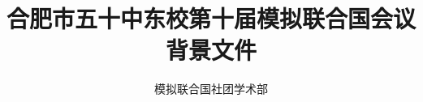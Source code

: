\documentclass{article}
\title{合肥市五十中东校第十届模拟联合国会议\\\huge 背景文件}
\author{模拟联合国社团学术部}
\begin{document}
    \centering
    \maketitle
    \clearpage
    \tableofcontents
\end{document}
